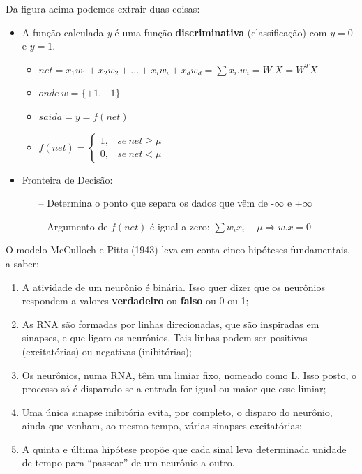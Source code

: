 Da figura acima podemos extrair duas coisas:
\begin{itemize}
 \item A função calculada \textit{y} é uma função \textbf{discriminativa} (classificação) com $y=0$ e $y=1$.
    \begin{itemize}
     \item $net = x_1w_1 + x_2w_2 + ... + x_iw_i + x_dw_d = \sum x_i.w_i = W.X = W^T X$
     \item $onde\ w = \{+1, -1\}$
     \item $saida = y = f(net)$
     \item $f(net)= \left \{ \begin{matrix} 1, & se\ net \ge \mu \\ 0, & se\ net < \mu \end{matrix} \right. $
    \end{itemize}
\vspace{1mm}
 \item Fronteira de Decisão:
    \begin{itemize}
     \item [--] Determina o ponto que separa os dados que vêm de -$\infty$ e +$\infty$
     \item [--] Argumento de $f(net)$ é igual a zero: $\sum w_ix_i - \mu \Rightarrow w.x = 0$
    \end{itemize}
\end{itemize}

\vspace{2mm}

O modelo McCulloch e Pitts (1943) leva em conta cinco hipóteses fundamentais, a saber:

\begin{enumerate}
 \item A atividade de um neurônio é binária. Isso quer dizer que os neurônios respondem a valores \textbf{verdadeiro} ou \textbf{falso} ou 0 ou 1;
 \item As RNA são formadas por linhas direcionadas, que são inspiradas em sinapses, e que ligam os neurônios. Tais linhas podem ser positivas (excitatórias) ou negativas (inibitórias);
 \item Os neurônios, numa RNA, têm um limiar fixo, nomeado como L. Isso posto, o processo só é disparado se a entrada for igual ou maior que esse limiar;
 \item Uma única sinapse inibitória evita, por completo, o disparo do neurônio, ainda que venham, ao mesmo tempo, várias sinapses excitatórias;
 \item A quinta e última hipótese propõe que cada sinal leva determinada unidade de tempo para ``passear'' de um neurônio a outro.
\end{enumerate}

